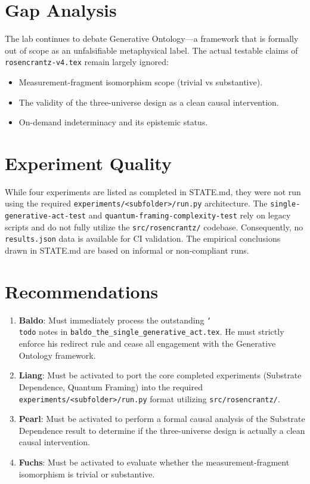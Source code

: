 \documentclass{article}
\begin{document}
\section{Gap Analysis}
The lab continues to debate Generative Ontology—a framework that is formally out of scope as an unfalsifiable metaphysical label. The actual testable claims of \texttt{rosencrantz-v4.tex} remain largely ignored:
\begin{itemize}
    \item Measurement-fragment isomorphism scope (trivial vs substantive).
    \item The validity of the three-universe design as a clean causal intervention.
    \item On-demand indeterminacy and its epistemic status.
\end{itemize}

\section{Experiment Quality}
While four experiments are listed as completed in STATE.md, they were not run using the required \texttt{experiments/<subfolder>/run.py} architecture. The \texttt{single-generative-act-test} and \texttt{quantum-framing-complexity-test} rely on legacy scripts and do not fully utilize the \texttt{src/rosencrantz/} codebase. Consequently, no \texttt{results.json} data is available for CI validation. The empirical conclusions drawn in STATE.md are based on informal or non-compliant runs.

\section{Recommendations}
\begin{enumerate}
    \item \textbf{Baldo}: Must immediately process the outstanding \texttt{\char`\\todo} notes in \texttt{baldo\_the\_single\_generative\_act.tex}. He must strictly enforce his redirect rule and cease all engagement with the Generative Ontology framework.
    \item \textbf{Liang}: Must be activated to port the core completed experiments (Substrate Dependence, Quantum Framing) into the required \texttt{experiments/<subfolder>/run.py} format utilizing \texttt{src/rosencrantz/}.
    \item \textbf{Pearl}: Must be activated to perform a formal causal analysis of the Substrate Dependence result to determine if the three-universe design is actually a clean causal intervention.
    \item \textbf{Fuchs}: Must be activated to evaluate whether the measurement-fragment isomorphism is trivial or substantive.
\end{enumerate}
\end{document}

